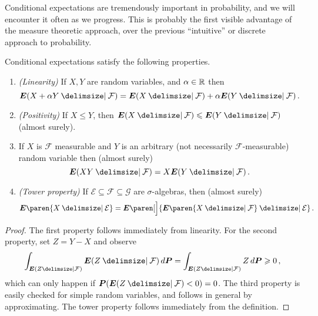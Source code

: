 Conditional expectations are tremendously important in probability, and we will encounter it often as we progress.
This is probably the first visible advantage of the measure theoretic approach, over the previous ``intuitive'' or discrete approach to probability.

\begin{proposition}
  Conditional expectations satisfy the following properties.
  \begin{enumerate}
    \item
      \emph{(Linearity)}
      If $X, Y$ are random variables, and $\alpha \in \mathbb{R}$ then
      \begin{equation*}
	\E( X + \alpha Y \given \mathcal F ) = \E( X \given \mathcal F ) + \alpha \E( Y \given \mathcal F )\,.
      \end{equation*}

    \item
      \emph{(Positivity)}
      If $X \leq Y$, then $\E(X \given \mathcal F) \leq \E(Y \given \mathcal F)$ (almost surely).

    \item If $X$ is $\mathcal F$ measurable and $Y$ is an arbitrary (not necessarily $\mathcal F$-measurable) random variable then (almost surely)
      \begin{equation*}
	\E( XY \given \mathcal F) = X \E( Y \given \mathcal F ) \,.
      \end{equation*}
    \item
      \emph{(Tower property)}
      If $\mathcal E \subseteq \mathcal F \subseteq \mathcal G$ are $\sigma$-algebras, then (almost surely)
      \begin{equation*}
	\E\paren{ X \given \mathcal E } =
	  \E\paren[\Big]{ \E\paren{ X \given \mathcal F } \given \mathcal E }\,.
      \end{equation*}
  \end{enumerate}
\end{proposition}
\begin{proof}
  The first property follows immediately from linearity.
  For the second property, set $Z = Y - X$ and observe
  \begin{equation*}
    \int_{\E(Z \given \mathcal F)} \E(Z \given \mathcal F) \, d\P
    = \int_{\E(Z \given \mathcal F)} Z \, d\P
    \geq 0\,,
  \end{equation*}
  which can only happen if $\P( \E( Z \given \mathcal F ) < 0 ) = 0$.
  The third property is easily checked for simple random variables, and follows in general by approximating.
  The tower property follows immediately from the definition.
\end{proof}



